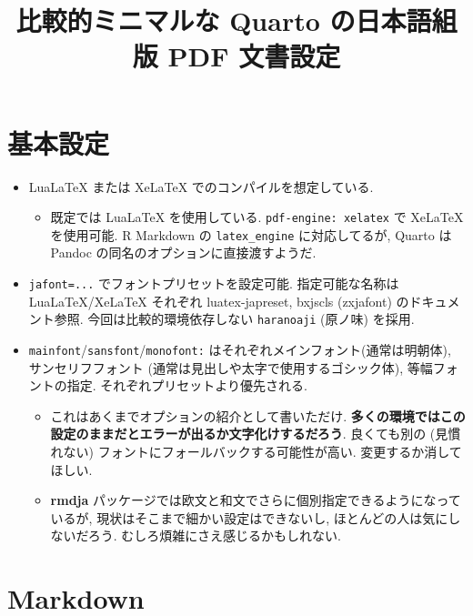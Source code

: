 \documentclass[
  letterpaper,
  DIV=11,
  pandoc,
  ja=standard,
  jafont=noto-otf]{bxjsarticle}
\title{比較的ミニマルな Quarto の日本語組版 PDF 文書設定}
\author{}
\date{}
\providecommand{\tightlist}{%
  \setlength{\itemsep}{0pt}\setlength{\parskip}{0pt}}
\begin{document}
\maketitle

\hypertarget{ux57faux672cux8a2dux5b9a}{%
\section{基本設定}\label{ux57faux672cux8a2dux5b9a}}

\begin{itemize}
\tightlist
\item
  LuaLaTeX または XeLaTeX でのコンパイルを想定している.

  \begin{itemize}
  \tightlist
  \item
    既定では LuaLaTeX を使用している. \texttt{pdf-engine:\ xelatex} で
    XeLaTeX を使用可能. R Markdown の \texttt{latex\_engine}
    に対応してるが, Quarto は Pandoc の同名のオプションに直接渡すようだ.
  \end{itemize}
\item
  \texttt{jafont=...} でフォントプリセットを設定可能. 指定可能な名称は
  LuaLaTeX/XeLaTeX それぞれ luatex-japreset, bxjscls (zxjafont)
  のドキュメント参照. 今回は比較的環境依存しない \texttt{haranoaji}
  (原ノ味) を採用.
\item
  \texttt{mainfont}/\texttt{sansfont}/\texttt{monofont:}
  はそれぞれメインフォント(通常は明朝体), サンセリフフォント
  (通常は見出しや太字で使用するゴシック体), 等幅フォントの指定.
  それぞれプリセットより優先される.

  \begin{itemize}
  \tightlist
  \item
    これはあくまでオプションの紹介として書いただけ.
    \textbf{多くの環境ではこの設定のままだとエラーが出るか文字化けするだろう}.
    良くても別の (見慣れない) フォントにフォールバックする可能性が高い.
    変更するか消してほしい.
  \item
    \textbf{rmdja}
    パッケージでは欧文と和文でさらに個別指定できるようになっているが,
    現状はそこまで細かい設定はできないし,
    ほとんどの人は気にしないだろう. むしろ煩雑にさえ感じるかもしれない.
  \end{itemize}
\end{itemize}

\hypertarget{markdown}{%
\section{Markdown}\label{markdown}}
\end{document}
